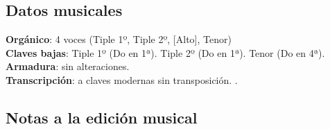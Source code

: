 
\subsection*{Datos musicales}

\noindent \textbf{Orgánico}: 4 voces (Tiple 1º, Tiple 2º, [Alto], Tenor)\\
\textbf{Claves bajas}: Tiple 1º (Do en 1ª). Tiple 2º (Do en 1ª). Tenor (Do en 4ª).\\
\textbf{Armadura}: sin alteraciones.\\
\textbf{Transcripción}: a claves modernas sin transposición. .


\subsection*{Notas a la edición musical}

\todo{}

